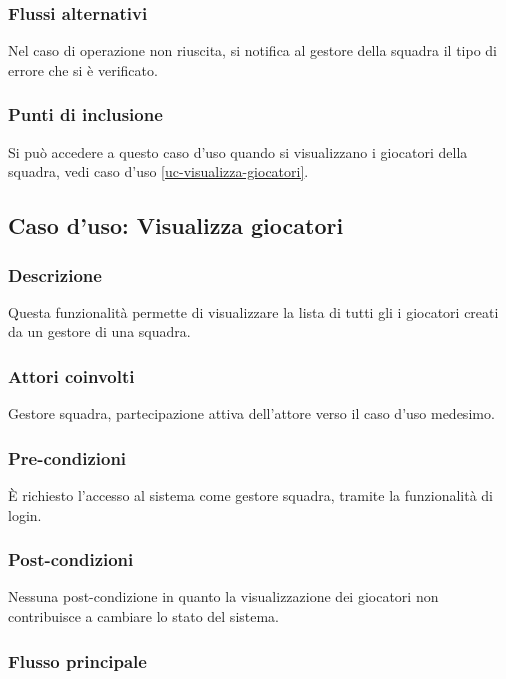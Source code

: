 \subsubsection*{Flussi alternativi}
Nel caso di operazione non riuscita, si notifica al gestore della squadra il tipo di errore che si è verificato.

\subsubsection*{Punti di inclusione}
Si può accedere a questo caso d'uso quando si visualizzano i giocatori della squadra, vedi caso d'uso \vref{uc-visualizza-giocatori}.


%
%
\subsection{Caso d'uso: Visualizza giocatori}
\label{uc-visualizza-giocatori}

\subsubsection*{Descrizione}
Questa funzionalità permette di visualizzare la lista di tutti gli i giocatori creati da un gestore di una squadra.

\subsubsection*{Attori coinvolti}
Gestore squadra, partecipazione attiva dell'attore verso il caso d'uso medesimo.

\subsubsection*{Pre-condizioni}
È richiesto l'accesso al sistema come gestore squadra, tramite la funzionalità di login.

\subsubsection*{Post-condizioni}
Nessuna post-condizione in quanto la visualizzazione dei giocatori non contribuisce a cambiare lo stato del sistema.

\subsubsection*{Flusso principale}

